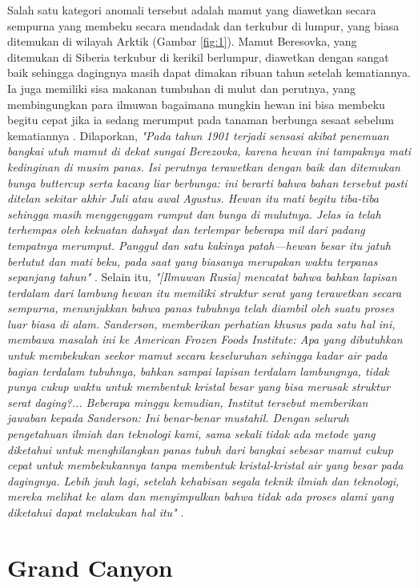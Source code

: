 \documentclass[10pt,twocolumn,letterpaper]{article}
\begin{document}
Salah satu kategori anomali tersebut adalah mamut yang diawetkan secara sempurna yang membeku secara mendadak dan terkubur di lumpur, yang biasa ditemukan di wilayah Arktik (Gambar \ref{fig:1}). Mamut Beresovka, yang ditemukan di Siberia terkubur di kerikil berlumpur, diawetkan dengan sangat baik sehingga dagingnya masih dapat dimakan ribuan tahun setelah kematiannya. Ia juga memiliki sisa makanan tumbuhan di mulut dan perutnya, yang membingungkan para ilmuwan bagaimana mungkin hewan ini bisa membeku begitu cepat jika ia sedang merumput pada tanaman berbunga sesaat sebelum kematiannya \cite{17}. Dilaporkan, \textit{"Pada tahun 1901 terjadi sensasi akibat penemuan bangkai utuh mamut di dekat sungai Berezovka, karena hewan ini tampaknya mati kedinginan di musim panas. Isi perutnya terawetkan dengan baik dan ditemukan bunga buttercup serta kacang liar berbunga: ini berarti bahwa bahan tersebut pasti ditelan sekitar akhir Juli atau awal Agustus. Hewan itu mati begitu tiba-tiba sehingga masih menggenggam rumput dan bunga di mulutnya. Jelas ia telah terhempas oleh kekuatan dahsyat dan terlempar beberapa mil dari padang tempatnya merumput. Panggul dan satu kakinya patah—hewan besar itu jatuh berlutut dan mati beku, pada saat yang biasanya merupakan waktu terpanas sepanjang tahun"} \cite{18}. Selain itu, \textit{"[Ilmuwan Rusia] mencatat bahwa bahkan lapisan terdalam dari lambung hewan itu memiliki struktur serat yang terawetkan secara sempurna, menunjukkan bahwa panas tubuhnya telah diambil oleh suatu proses luar biasa di alam. Sanderson, memberikan perhatian khusus pada satu hal ini, membawa masalah ini ke American Frozen Foods Institute: Apa yang dibutuhkan untuk membekukan seekor mamut secara keseluruhan sehingga kadar air pada bagian terdalam tubuhnya, bahkan sampai lapisan terdalam lambungnya, tidak punya cukup waktu untuk membentuk kristal besar yang bisa merusak struktur serat daging?... Beberapa minggu kemudian, Institut tersebut memberikan jawaban kepada Sanderson: Ini benar-benar mustahil. Dengan seluruh pengetahuan ilmiah dan teknologi kami, sama sekali tidak ada metode yang diketahui untuk menghilangkan panas tubuh dari bangkai sebesar mamut cukup cepat untuk membekukannya tanpa membentuk kristal-kristal air yang besar pada dagingnya. Lebih jauh lagi, setelah kehabisan segala teknik ilmiah dan teknologi, mereka melihat ke alam dan menyimpulkan bahwa tidak ada proses alami yang diketahui dapat melakukan hal itu"} \cite{19}.

\section{Grand Canyon}
\end{document}
